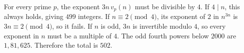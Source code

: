 For every prime $p$, the exponent $3n\,v_p(n)$ must be divisible by $4$. If $4\mid n$, this always holds, giving $499$ integers. If $n\equiv2\pmod4$, its exponent of $2$ in $n^{3n}$ is $3n\equiv2\pmod4$, so it fails. If $n$ is odd, $3n$ is invertible modulo $4$, so every exponent in $n$ must be a multiple of $4$. The odd fourth powers below $2000$ are $1,81,625$. Therefore the total is $\boxed{502}$.
